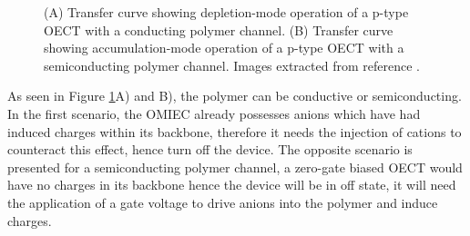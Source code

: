 \begin{figure}[h]
	\centering
	\hspace{2em}
	\caption[Depletion- and accumulation-mode OECTs]{(A) Transfer curve showing depletion-mode operation of a p-type OECT with a conducting polymer channel. (B) Transfer curve showing accumulation-mode operation of a p-type OECT with a semiconducting polymer channel. Images extracted from reference \cite{rivnayOrganicElectrochemicalTransistors2018}.}
	\label{fig:modes}
\end{figure}

As seen in Figure \ref{fig:modes}A) and B), the polymer can be conductive or semiconducting. In the first scenario, the OMIEC already possesses anions which have had induced charges within its backbone, therefore it needs the injection of cations to counteract this effect, hence turn off the device. The opposite scenario is presented for a semiconducting polymer channel, a zero-gate biased OECT would have no charges in its backbone hence the device will be in off state, it will need the application of a gate voltage to drive anions into the polymer and induce charges.

